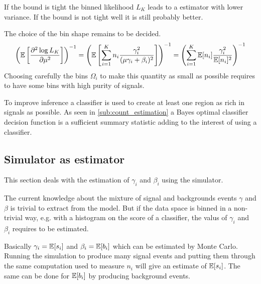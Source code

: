 If the bound is tight the binned likelihood $L_K$ leads to a estimator with lower variance.
If the bound is not tight well it is still probably better.

The choice of the bin shape remains to be decided.
\begin{equation}
    \left (\mathbb{E} \left [ \frac{\partial^2 \log L_K}{\partial \mu^2}\right ] \right )^{-1} 
    	= \left ( \mathbb{E} \left [ \sum_{i=1}^K n_i \frac{\gamma_i^2}{(\mu \gamma_i + \beta_i)^2} \right ] \right )^{-1}
    	= \left ( \sum_{i=1}^K \mathbb{E} [n_i] \frac{\gamma_i^2}{\mathbb{E}[n_i]^2} \right )^{-1}
\end{equation}
Choosing carefully the bins $\Omega_i$ to make this quantity as small as possible requires to have some bins with high purity of signals.

To improve inference a classifier is used to create at least one region as rich in signals as possible.
As seen in \autoref{sub:count_estimation} a Bayes optimal classifier decision function is a sufficient summary statistic adding to the interest of using a classifier.






\subsection{Simulator as estimator} %
\label{sub:simulator_as_estimator}

This section deals with the estimation of $\gamma_i$ and $\beta_i$ using the simulator.


The current knowledge about the mixture of signal and backgrounds events $\gamma$ and $\beta$ is trivial to extract from the model.
But if the data space is binned in a non-trivial way, e.g. with a histogram on the score of a classifier, the valus of $\gamma_i$ and $\beta_i$ requires to be estimated.

Basically $\gamma_i = \mathbb{E} [s_i]$ and $\beta_i = \mathbb{E} [b_i]$ which can be estimated by Monte Carlo.
Running the simulation to produce many signal events and putting them through the same computation used to measure $n_i$ will give an estimate of $\mathbb{E} [s_i]$.
The same can be done for $\mathbb{E} [b_i]$ by producing background events.










